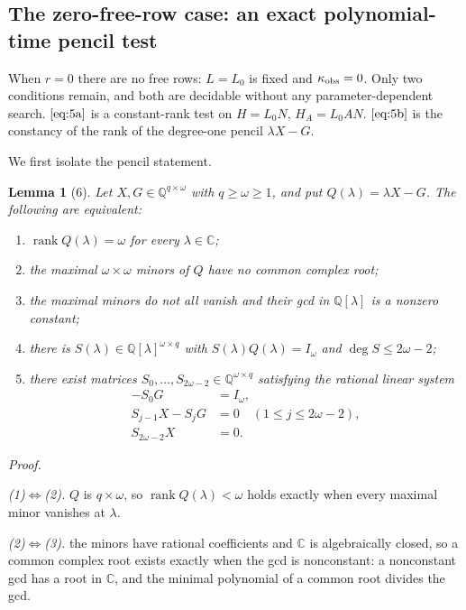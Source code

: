 \documentclass[journal]{IEEEtran}
\theoremstyle{plainn}
\newtheorem{lem}{Lemma}
\theoremstyle{remark}
\begin{document}
\subsection{The zero-free-row case: an exact polynomial-time pencil test}\label{sec:zero}
When $r=0$ there are no free rows: $L=L_0$ is fixed and $\kappa_{\rm obs}=0$. Only two conditions remain, and both are decidable without any parameter-dependent search. $\eqref{eq:5a}$ is a constant-rank test on $H=L_0N$, $H_A=L_0AN$. $\eqref{eq:5b}$ is the constancy of the rank of the degree-one pencil $\lambda X-G$.

We first isolate the pencil statement.

\begin{lem}[6] Let $X,G\in\mathbb Q^{q\times\omega}$ with $q\ge\omega\ge1$, and put $Q(\lambda)=\lambda X-G$. The following are equivalent:

\begin{enumerate}
\item $\operatorname{rank}Q(\lambda)=\omega$ for every $\lambda\in\mathbb C$;
\item the maximal $\omega\times\omega$ minors of $Q$ have no common complex root;
\item the maximal minors do not all vanish and their gcd in $\mathbb Q[\lambda]$ is a nonzero constant;
\item there is $S(\lambda)\in\mathbb Q[\lambda]^{\omega\times q}$ with $S(\lambda)Q(\lambda)=I_\omega$ and $\deg S\le2\omega-2$;
\item there exist matrices $S_0,\dots,S_{2\omega-2}\in\mathbb Q^{\omega\times q}$ satisfying the rational linear system \begin{equation}
\tag{R0}\label{eq:R0}
\begin{aligned}
-S_0G&=I_\omega,\\
S_{j-1}X-S_jG&=0\quad(1\le j\le2\omega-2),\\
S_{2\omega-2}X&=0 .
\end{aligned}
\end{equation}
\end{enumerate}
\end{lem}
\emph{Proof.}

\emph{(1)$\Leftrightarrow$(2).} $Q$ is $q\times\omega$, so $\operatorname{rank}Q(\lambda)<\omega$ holds exactly when every maximal minor vanishes at $\lambda$.

\emph{(2)$\Leftrightarrow$(3).} the minors have rational coefficients and $\mathbb C$ is algebraically closed, so a common complex root exists exactly when the gcd is nonconstant: a nonconstant gcd has a root in $\mathbb C$, and the minimal polynomial of a common root divides the gcd.
\end{document}
